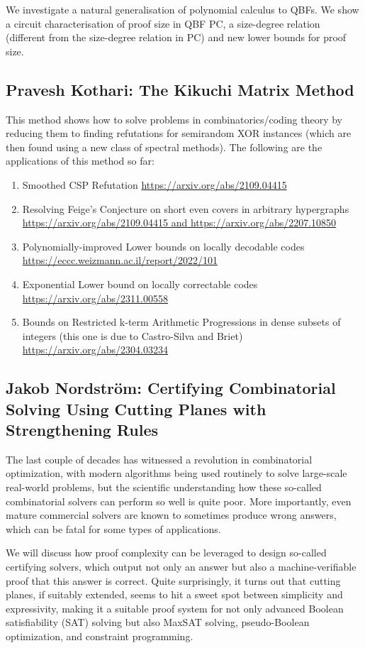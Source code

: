 \documentclass[11pt]{article}
\begin{document}
We investigate a natural generalisation of polynomial calculus to QBFs. We show a circuit characterisation of proof size in QBF PC, a size-degree relation (different from the size-degree relation in PC) and new lower bounds for proof size. 

\subsection*{Pravesh Kothari: The Kikuchi Matrix Method}\label{Kothari}

This method shows how to solve problems in combinatorics/coding theory by reducing them to finding refutations for semirandom XOR instances (which are then found using a new class of spectral methods). The following are the applications of this method so far:
\begin{enumerate}
\item Smoothed CSP Refutation \url{https://arxiv.org/abs/2109.04415} 
\item Resolving Feige's Conjecture on short even covers in arbitrary hypergraphs \url{https://arxiv.org/abs/2109.04415 and https://arxiv.org/abs/2207.10850} 
\item Polynomially-improved Lower bounds on locally decodable codes \url{https://eccc.weizmann.ac.il/report/2022/101} 
\item Exponential Lower bound on locally correctable codes \url{https://arxiv.org/abs/2311.00558} 
\item Bounds on Restricted k-term Arithmetic Progressions in dense subsets of integers (this one is due to Castro-Silva and Briet) \url{https://arxiv.org/abs/2304.03234}
\end{enumerate}

\subsection*{Jakob Nordstr\"{o}m: Certifying Combinatorial Solving Using Cutting Planes with Strengthening Rules}\label{Nordstrom}


The last couple of decades has witnessed a revolution in combinatorial optimization, with modern algorithms being used routinely to solve large-scale real-world problems, but the scientific understanding how these so-called combinatorial solvers can perform so well is quite poor. More importantly, even mature commercial solvers are known to sometimes produce wrong answers, which can be fatal for some types of applications.

We will discuss how proof complexity can be leveraged to design so-called certifying solvers, which output not only an answer but also a machine-verifiable proof that this answer is correct. Quite surprisingly, it turns out that cutting planes, if suitably extended, seems to hit a sweet spot between simplicity and expressivity, making it a suitable proof system for not only advanced Boolean satisfiability (SAT) solving but also MaxSAT solving, pseudo-Boolean optimization, and constraint programming.
\end{document}
